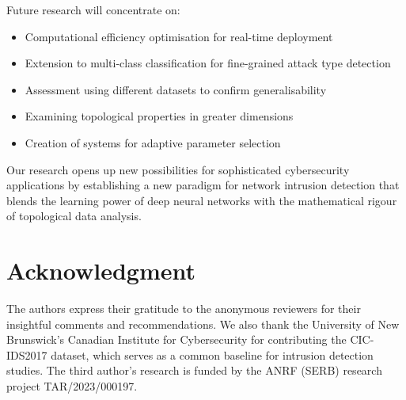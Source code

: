 \documentclass[conference]{IEEEtran}
\begin{document}
Future research will concentrate on:

\begin{itemize}
\item Computational efficiency optimisation for real-time deployment
\item Extension to multi-class classification for fine-grained attack type detection
\item Assessment using different datasets to confirm generalisability
\item Examining topological properties in greater dimensions
\item Creation of systems for adaptive parameter selection
\end{itemize}

Our research opens up new possibilities for sophisticated cybersecurity applications by establishing a new paradigm for network intrusion detection that blends the learning power of deep neural networks with the mathematical rigour of topological data analysis.

\section{Acknowledgment}

The authors express their gratitude to the anonymous reviewers for their insightful comments and recommendations. We also thank the University of New Brunswick's Canadian Institute for Cybersecurity for contributing the CIC-IDS2017 dataset, which serves as a common baseline for intrusion detection studies. The third author's research is funded by the ANRF (SERB) research project TAR/2023/000197.
\end{document}
